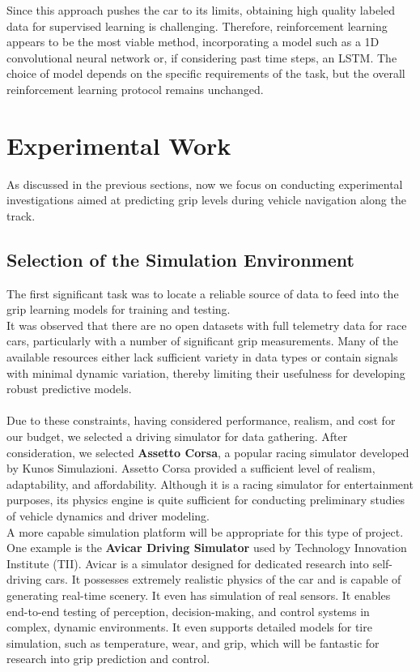 \documentclass[a4paper,final,12pt]{report}
\begin{document}
Since this approach pushes the car to its limits, obtaining high quality labeled data for supervised learning is challenging. Therefore, reinforcement learning appears to be the most viable method, incorporating a model such as a 1D convolutional neural network or, if considering past time steps, an LSTM. The choice of model depends on the specific requirements of the task, but the overall reinforcement learning protocol remains unchanged.

\chapter{Experimental Work}
As discussed in the previous sections, now we focus on conducting experimental investigations aimed at predicting grip levels during vehicle navigation along the track.

\section{Selection of the Simulation Environment}
The first significant task was to locate a reliable source of data to feed into the grip learning models for training and testing. \\

It was observed that there are no open datasets with full telemetry data for race cars, particularly with a number of significant grip measurements. Many of the available resources either lack sufficient variety in data types or contain signals with minimal dynamic variation, thereby limiting their usefulness for developing robust predictive models.\\\\

Due to these constraints, having considered performance, realism, and cost for our budget, we selected a driving simulator for data gathering. After consideration, we selected \textbf{Assetto Corsa}, a popular racing simulator developed by Kunos Simulazioni. Assetto Corsa provided a sufficient level of realism, adaptability, and affordability. Although it is a racing simulator for entertainment purposes, its physics engine is quite sufficient for conducting preliminary studies of vehicle dynamics and driver modeling.\\

A more capable simulation platform will be appropriate for this type of project. One example is the \textbf{Avicar Driving Simulator} used by Technology Innovation Institute (TII). Avicar is a simulator designed for dedicated research into self-driving cars. It possesses extremely realistic physics of the car and is capable of generating real-time scenery. It even has simulation of real sensors. It enables end-to-end testing of perception, decision-making, and control systems in complex, dynamic environments. It even supports detailed models for tire simulation, such as temperature, wear, and grip, which will be fantastic for research into grip prediction and control.\\
\end{document}
